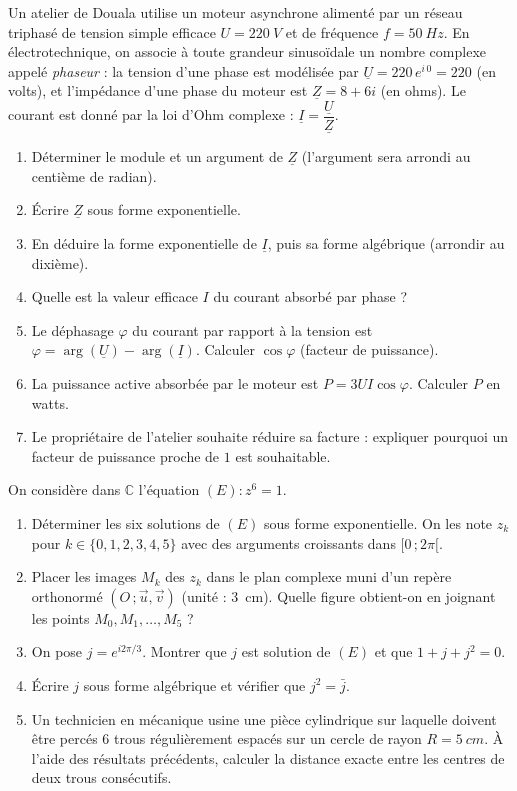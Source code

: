 \documentclass[11pt]{article}
\begin{document}
\begin{exercice}
Un atelier de Douala utilise un moteur asynchrone alimenté par un réseau triphasé de tension simple efficace $U = \SI{220}{V}$ et de fréquence $f = \SI{50}{Hz}$. En électrotechnique, on associe à toute grandeur sinusoïdale un nombre complexe appelé \emph{phaseur} : la tension d'une phase est modélisée par $\underline{U} = 220\,e^{i\,0} = 220$ (en volts), et l'impédance d'une phase du moteur est $\underline{Z} = 8 + 6i$ (en ohms). Le courant est donné par la loi d'Ohm complexe : $\underline{I} = \dfrac{\underline{U}}{\underline{Z}}$.
\begin{enumerate}
\item Déterminer le module et un argument de $\underline{Z}$ (l'argument sera arrondi au centième de radian).
\item Écrire $\underline{Z}$ sous forme exponentielle.
\item En déduire la forme exponentielle de $\underline{I}$, puis sa forme algébrique (arrondir au dixième).
\item Quelle est la valeur efficace $I$ du courant absorbé par phase ?
\item Le déphasage $\varphi$ du courant par rapport à la tension est $\varphi = \arg(\underline{U}) - \arg(\underline{I})$. Calculer $\cos\varphi$ (facteur de puissance).
\item La puissance active absorbée par le moteur est $P = 3UI\cos\varphi$. Calculer $P$ en watts.
\item Le propriétaire de l'atelier souhaite réduire sa facture : expliquer pourquoi un facteur de puissance proche de $1$ est souhaitable.
\end{enumerate}
\end{exercice}

\begin{exercice}
On considère dans $\mathbb{C}$ l'équation $(E) : z^6 = 1$.
\begin{enumerate}
\item Déterminer les six solutions de $(E)$ sous forme exponentielle. On les note $z_k$ pour $k \in \{0, 1, 2, 3, 4, 5\}$ avec des arguments croissants dans $[0\,;2\pi[$.
\item Placer les images $M_k$ des $z_k$ dans le plan complexe muni d'un repère orthonormé $(O\,;\vec{u},\vec{v})$ (unité : \SI{3}{cm}). Quelle figure obtient-on en joignant les points $M_0, M_1, \ldots, M_5$ ?
\item On pose $j = e^{i2\pi/3}$. Montrer que $j$ est solution de $(E)$ et que $1 + j + j^2 = 0$.
\item Écrire $j$ sous forme algébrique et vérifier que $j^2 = \bar{j}$.
\item Un technicien en mécanique usine une pièce cylindrique sur laquelle doivent être percés $6$ trous régulièrement espacés sur un cercle de rayon $R = \SI{5}{cm}$. À l'aide des résultats précédents, calculer la distance exacte entre les centres de deux trous consécutifs.
\end{enumerate}
\end{exercice}
\end{document}
